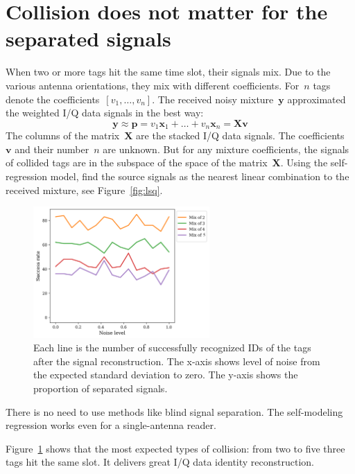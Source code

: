 \documentclass[12pt]{article}
\newcommand{\bx}{\mathbf{x}}
\begin{document}
\section{Collision does not matter for the separated signals}
When two or more tags hit the same time slot, their signals mix. Due to the various antenna orientations, they mix with different coefficients.  For~$n$ tags denote the coefficients~$[v_1, \dots, v_n]$. The received noisy mixture~$\mathbf{y}$ approximated the weighted I/Q data signals in the best way:
\[
\mathbf{y} \approx \mathbf{p} = v_1 \bx_1 + \dots + v_n \bx_n = \mathbf{X}\mathbf{v}
\] 
The columns of the matrix~$\mathbf{X}$ are the stacked I/Q data signals. 
The coefficients~$\mathbf{v}$ and their number~$n$ are unknown. But for any mixture coefficients, the signals of collided tags are in the subspace of the space of the matrix~$\mathbf{X}$. Using the self-regression model, find the source signals as the nearest linear combination to the received mixture, see Figure~\ref{fig:lsq}.

\begin{figure}[!htp]
\centering
\includegraphics[width=0.6\textwidth]{fig_mix_one.png}
\caption{Each line is the number of successfully recognized IDs of the tags after the signal reconstruction. The x-axis shows level of noise from the expected standard deviation to zero. The y-axis shows the proportion of separated signals.}
\label{fig:separation}
\end{figure}
There is no need to use methods like blind signal separation. The self-modeling regression works even for a single-antenna reader. 

Figure~\ref{fig:separation} shows that the most expected types of collision: from two to five three tags hit the same slot. It delivers great I/Q data identity reconstruction.

\end{document}

